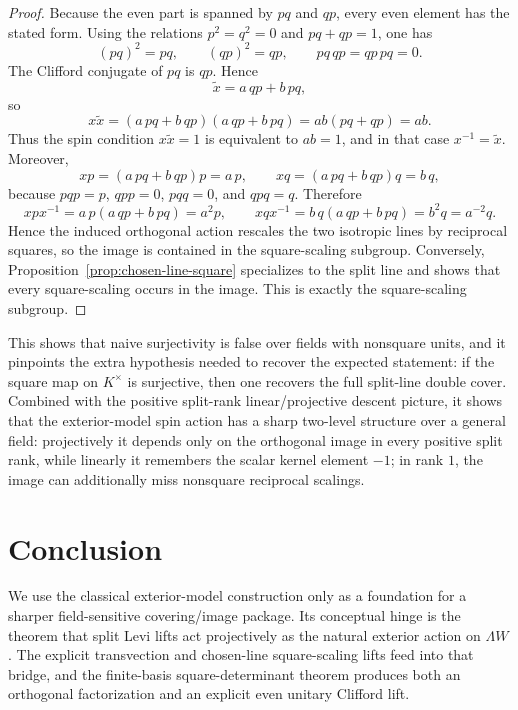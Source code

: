 \documentclass{birkjour}
\theoremstyle{plain}
\theoremstyle{definition}
\theoremstyle{remark}
\newcommand{\wedgeW}{\Lambda W}
\begin{document}
\begin{proof}
Because the even part is spanned by $pq$ and $qp$, every even element has the
stated form. Using the relations $p^2=q^2=0$ and $pq+qp=1$, one has
\[
  (pq)^2=pq,\qquad (qp)^2=qp,\qquad pq\,qp=qp\,pq=0.
\]
The Clifford conjugate of \(pq\) is \(qp\).
Hence
\[
  \tilde x = a\,qp+b\,pq,
\]
so
\[
  x\tilde x
  =(a\,pq+b\,qp)(a\,qp+b\,pq)
  =ab(pq+qp)
  =ab.
\]
Thus the spin condition $x\tilde x=1$ is equivalent to $ab=1$, and in that case
$x^{-1}=\tilde x$. Moreover,
\[
  xp=(a\,pq+b\,qp)p=a\,p,\qquad xq=(a\,pq+b\,qp)q=b\,q,
\]
because $pqp=p$, $qpp=0$, $pqq=0$, and $qpq=q$. Therefore
\[
  xpx^{-1}=a\,p(a\,qp+b\,pq)=a^2p,
  \qquad
  xqx^{-1}=b\,q(a\,qp+b\,pq)=b^2q=a^{-2}q.
\]
Hence the induced orthogonal action rescales the two isotropic lines by
reciprocal squares, so the image is contained in the square-scaling subgroup.
Conversely, Proposition~\ref{prop:chosen-line-square} specializes to the split
line and shows that every square-scaling occurs in the image. This is exactly
the square-scaling subgroup.
\end{proof}

This shows that naive surjectivity is false over fields with nonsquare units,
and it pinpoints the extra hypothesis needed to recover the expected statement:
if the square map on $K^\times$ is surjective, then one recovers the full
split-line double cover. Combined with the positive split-rank
linear/projective descent picture, it shows that the exterior-model spin action
has a sharp two-level structure over a general field: projectively it depends
only on the orthogonal image in every positive split rank, while linearly it
remembers the scalar kernel element $-1$; in rank $1$, the image can
additionally miss nonsquare reciprocal scalings.

\section{Conclusion}
\label{sec:conclusion}

We use the classical exterior-model construction only as a foundation
for a sharper field-sensitive covering/image package. Its conceptual hinge is
the theorem that split Levi lifts act projectively as the natural exterior
action on $\wedgeW$. The explicit transvection and chosen-line
square-scaling lifts feed into that bridge, and the finite-basis
square-determinant theorem produces both an orthogonal factorization and an
explicit even unitary Clifford lift.
\end{document}

